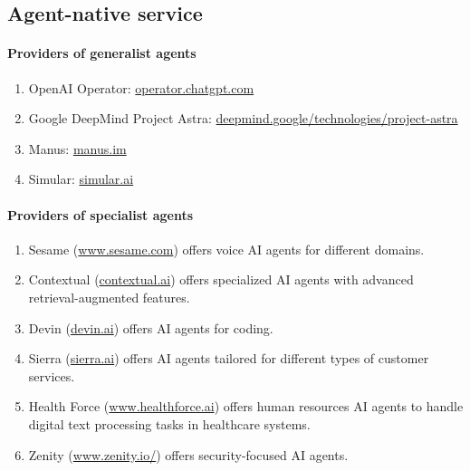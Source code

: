 \documentclass[11pt]{article}
\begin{document}
\subsection{Agent-native service}
\paragraph{Providers of generalist agents}
\begin{enumerate}[wide, labelindent=0pt, itemsep=-1pt, topsep=1pt]
    \item[\textbullet] OpenAI Operator: \href{https://operator.chatgpt.com/}{operator.chatgpt.com}
    \item[\textbullet] Google DeepMind Project Astra: \href{https://deepmind.google/technologies/project-astra/}{deepmind.google/technologies/project-astra}
    \item[\textbullet] Manus: \href{https://manus.im/}{manus.im}
    \item[\textbullet] Simular: \href{https://www.simular.ai/}{simular.ai}
\end{enumerate}

\paragraph{Providers of specialist agents}
\begin{enumerate}[wide, labelindent=0pt, itemsep=-1pt, topsep=1pt]
    \item[\textbullet] Sesame (\href{https://www.sesame.com/}{www.sesame.com}) offers voice AI agents for different domains.
    \item[\textbullet] Contextual (\href{https://contextual.ai/}{contextual.ai}) offers specialized AI agents with advanced retrieval-augmented features. 
    \item[\textbullet] Devin (\href{https://devin.ai/}{devin.ai}) offers AI agents for coding.
    \item[\textbullet] Sierra (\href{https://sierra.ai/}{sierra.ai}) offers AI agents tailored for different types of customer services.
    \item[\textbullet] Health Force (\href{https://www.healthforce.ai/}{www.healthforce.ai}) offers human resources AI agents to handle digital text processing tasks in healthcare systems.
    \item[\textbullet] Zenity (\href{https://www.zenity.io/}{www.zenity.io/}) offers security-focused AI agents.
\end{enumerate}
\end{document}
